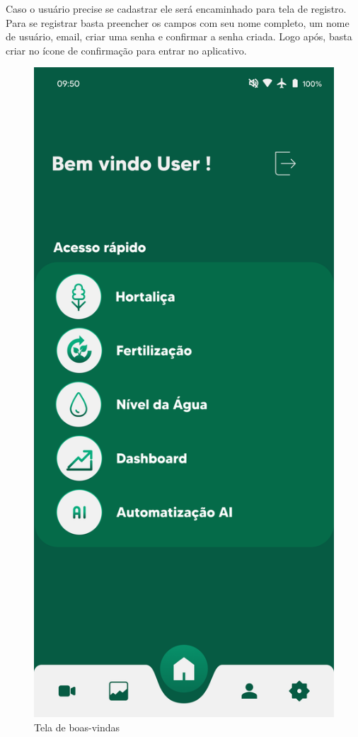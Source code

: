 Caso o usuário precise se cadastrar ele será encaminhado para tela de registro. Para se registrar basta preencher os campos com seu nome completo, um nome de usuário, email, criar uma senha e confirmar a senha criada. Logo após, basta criar no ícone de confirmação para entrar no aplicativo.

\begin{figure}[!h]
\centering
\caption{Tela de boas-vindas}
\label{fig:picture4}
\includegraphics[scale=0.2]{Illustrations/Picture4.png}
\end{figure}
  
